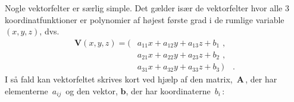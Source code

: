 Nogle vektorfelter er særlig simple. Det gælder især
de vektorfelter hvor alle 3 koordinatfunktioner
er polynomier af højest første grad i de rumlige
variable $(x,y,z)$, dvs.
\begin{equation}
\begin{aligned}
{\mathbf{V}}(x,y,z) = (&a_{11}x + a_{12}y + a_{13}z + b_{1}\,\, , \\
&a_{21}x + a_{22}y + a_{23}z + b_{2}\, \, , \\   &a_{31}x + a_{32}y + a_{33}z +
b_{3}\,) \quad .
\end{aligned}
\end{equation}
I så fald kan vektorfeltet skrives kort ved hjælp af den matrix,
$\,{\mathbf{A}}\,$, der har elementerne $\,a_{ij}\,$ og den vektor,
${\mathbf{b}}$, der har koordinaterne $\,b_{i}\,$:

